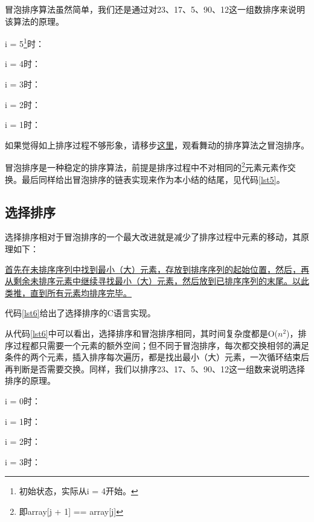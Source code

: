 \documentclass[a4paper, 12pt, titlepage]{article}
\begin{document}
冒泡排序算法虽然简单，我们还是通过对23、17、5、90、12这一组数排序来说明该算法的原理。

i = 5\footnote{初始状态，实际从i = 4开始。}时：


i = 4时：


i = 3时：


i = 2时：


i = 1时：


如果觉得如上排序过程不够形象，请移步\href{http://v.youku.com/v_show/id_XMzMyOTAyMzQ0.html}{这里}，观看舞动的排序算法之冒泡排序。

冒泡排序是一种稳定的排序算法，前提是排序过程中不对相同的\footnote{即array[j + 1] == array[j]}元素元素作交换。最后同样给出冒泡排序的链表实现来作为本小结的结尾，见代码\ref{lst5}。
\begin{spacing}{1.0}
  
\end{spacing}


\subsection{选择排序}
选择排序相对于冒泡排序的一个最大改进就是减少了排序过程中元素的移动，其原理如下：

\href{http://zh.wikipedia.org/wiki/\%E9\%80\%89\%E6\%8B\%A9\%E6\%8E\%92\%E5\%BA\%8F}{首先在未排序序列中找到最小（大）元素，存放到排序序列的起始位置，然后，再从剩余未排序元素中继续寻找最小（大）元素，然后放到已排序序列的末尾。以此类推，直到所有元素均排序完毕。}

代码\ref{lst6}给出了选择排序的C语言实现。
\begin{spacing}{1.0}
  
\end{spacing}

从代码\ref{lst6}中可以看出，选择排序和冒泡排序相同，其时间复杂度都是O($n^2$)，排序过程都只需要一个元素的额外空间；但不同于冒泡排序，每次都交换相邻的满足条件的两个元素，插入排序每次遍历，都是找出最小（大）元素，一次循环结束后再判断是否需要交换。同样，我们以排序23、17、5、90、12这一组数来说明选择排序的原理。

i = 0时：


i = 1时：


i = 2时：


i = 3时：

\end{document}
